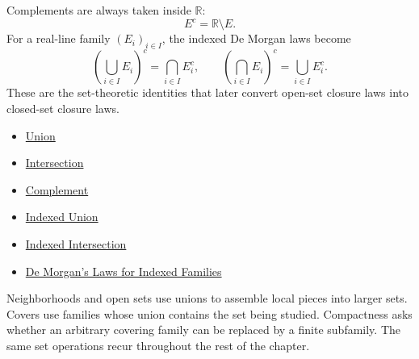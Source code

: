 \begin{remark*}[Interpretation]
Complements are always taken inside \(\mathbb R\):
\[
  E^c=\mathbb R\setminus E.
\]
For a real-line family \((E_i)_{i\in I}\), the indexed De Morgan laws become
\[
  \left(\bigcup_{i\in I}E_i\right)^c
  =
  \bigcap_{i\in I}E_i^c,
  \qquad
  \left(\bigcap_{i\in I}E_i\right)^c
  =
  \bigcup_{i\in I}E_i^c.
\]
These are the set-theoretic identities that later convert open-set closure
laws into closed-set closure laws.
\end{remark*}
\begin{dependencies}
\begin{itemize}
  \item \hyperref[def:union]{Union}
  \item \hyperref[def:intersection]{Intersection}
  \item \hyperref[def:complement]{Complement}
  \item \hyperref[def:indexed-union]{Indexed Union}
  \item \hyperref[def:indexed-intersection]{Indexed Intersection}
  \item \hyperref[thm:indexed-de-morgan]{De Morgan's Laws for Indexed Families}
\end{itemize}
\end{dependencies}

\begin{remark*}[Interpretation]
Neighborhoods and open sets use unions to assemble local pieces into larger
sets. Covers use families whose union contains the set being studied.
Compactness asks whether an arbitrary covering family can be replaced by a
finite subfamily. The same set operations recur throughout the rest of the
chapter.
\end{remark*}
